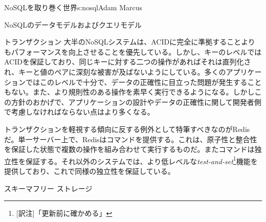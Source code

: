 \begin{aosachapter}{NoSQLを取り巻く世界}{s:nosql}{Adam Marcus}
\begin{aosasect1}{NoSQLのデータモデルおよびクエリモデル}
\begin{aosasect2}{トランザクション}
大半のNoSQLシステムは、ACIDに完全に準拠することよりもパフォーマンスを向上させることを優先している。しかし、キーのレベルではACIDを保証しており、同じキーに対する二つの操作があればそれは直列化され、キーと値のペアに深刻な被害が及ばないようにしている。多くのアプリケーションではこのレベルで十分で、データの正確性に目立った問題が発生することもない。また、より規則性のある操作を素早く実行できるようになる。しかしこの方針のおかげで、アプリケーションの設計やデータの正確性に関して開発者側で考慮しなければならない点はより多くなる。

トランザクションを軽視する傾向に反する例外として特筆すべきなのがRedisだ。単一サーバー上で、Redisはコマンドを提供する。これは、原子性と整合性を保証した状態で複数の操作を組み合わせて実行するものだ。またコマンドは独立性を保証する。それ以外のシステムでは、より低レベルな\emph{test-and-set}\footnote{[訳注]「更新前に確かめる」}機能を提供しており、これで同様の独立性を保証している。

\end{aosasect2}

\begin{aosasect2}{スキーマフリー ストレージ}


\end{aosasect2}
\end{aosasect1}
\end{aosachapter}
